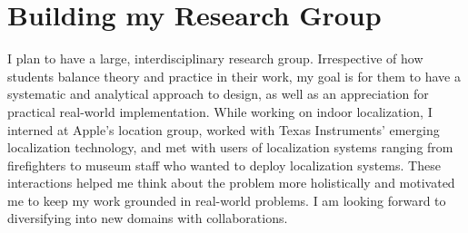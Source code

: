 \documentclass[10pt]{article}
\begin{document}

\section{Building my Research Group}

I plan to have a large, interdisciplinary research group. Irrespective of how students balance theory and practice in their work, my goal is for them to have a systematic and analytical approach to design, as well as an appreciation for practical real-world implementation. While working on indoor localization, I interned at Apple's location group, worked with Texas Instruments' emerging localization technology, and met with users of localization systems ranging from firefighters to museum staff who wanted to deploy localization systems. These interactions helped me think about the problem more holistically and motivated me to keep my work grounded in real-world problems. I am looking forward to diversifying into new domains with collaborations.  \\
\end{document}
